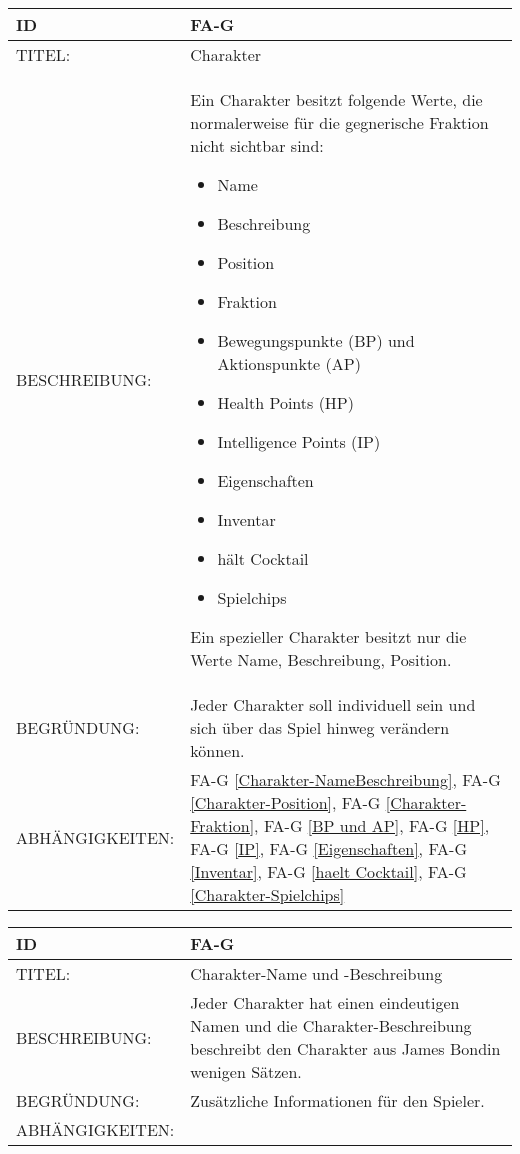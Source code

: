 \begin{tabularx}{16cm}{l|X}
	{table}\label{Charakter}
	\textbf{ID} & \textbf{FA-G \arabic{table}} \\
	\hline
	TITEL: & Charakter \\
	\hline
	BESCHREIBUNG: & Ein Charakter besitzt folgende Werte, die normalerweise für die gegnerische Fraktion nicht sichtbar sind: 
	\begin{itemize}
		\item Name
		\item Beschreibung
		\item Position
		\item Fraktion
		\item Bewegungspunkte (BP) und Aktionspunkte (AP)
		\item Health Points (HP)
		\item Intelligence Points (IP)
		\item Eigenschaften
		\item Inventar
		\item hält Cocktail
		\item Spielchips
	\end{itemize}
	Ein spezieller Charakter besitzt nur die Werte Name, Beschreibung, Position.
	\\
	\hline
	BEGRÜNDUNG: & Jeder Charakter soll individuell sein und sich über das Spiel hinweg verändern können.\\
	\hline
	ABHÄNGIGKEITEN: & FA-G \ref{Charakter-NameBeschreibung}, FA-G \ref{Charakter-Position}, FA-G \ref{Charakter-Fraktion},  FA-G \ref{BP und AP}, FA-G \ref{HP}, FA-G \ref{IP}, FA-G \ref{Eigenschaften}, FA-G \ref{Inventar}, FA-G \ref{haelt Cocktail}, FA-G \ref{Charakter-Spielchips} \\
\end{tabularx}

\begin{tabularx}{16cm}{l|X}
	{table}\label{Charakter-NameBeschreibung}
	\textbf{ID} & \textbf{FA-G \arabic{table}} \\
	\hline
	TITEL: & Charakter-Name und -Beschreibung \\
	\hline
	BESCHREIBUNG: & Jeder Charakter hat einen eindeutigen Namen und die Charakter-Beschreibung beschreibt den Charakter aus \glqq James Bond\grqq in wenigen Sätzen.\\
	\hline
	BEGRÜNDUNG: & Zusätzliche Informationen für den Spieler. \\
	\hline
	ABHÄNGIGKEITEN: & \\
\end{tabularx}

